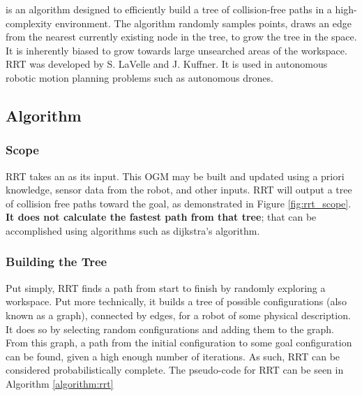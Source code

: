 
 is an algorithm designed to efficiently build a tree of collision-free paths in a high-complexity environment. The algorithm randomly samples points, draws an edge from the nearest currently existing node in the tree, to grow the tree in the space. It is inherently biased to grow towards large unsearched areas of the workspace. RRT was developed by S. LaVelle\cite{LaValle1998} and J. Kuffner\cite{LaValle2001}. It is used in autonomous robotic motion planning problems such as autonomous drones.

\subsection{Algorithm}

    \subsubsection{Scope}
        \gls{RRT} takes an  as its input. This \gls{OGM} may be built and updated using \gls{a priori} knowledge, sensor data from the robot, and other inputs. \gls{RRT} will output a tree of collision free paths toward the goal, as demonstrated in Figure \ref{fig:rrt_scope}. \textbf{It does not calculate the fastest path from that tree}; that can be accomplished using algorithms such as \Gls{dijkstra's algorithm}.

        

    \subsubsection{Building the Tree}

        Put simply, \gls{RRT} finds a path from start to finish by randomly exploring a workspace.
        Put more technically, it builds a tree of possible \glspl{configuration} (also known as a graph), connected by edges, for a robot of some physical description. It does so by selecting random \glspl{configuration} and adding them to the graph. 
        From this graph, a path from the initial \gls{configuration} to some goal \gls{configuration} can be found, given a high enough number of iterations. As such, \gls{RRT} can be considered \gls{probabilistically complete}.
        The pseudo-code for \gls{RRT} can be seen in Algorithm \ref{algorithm:rrt}
        
